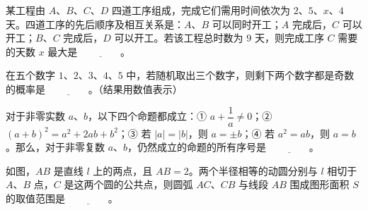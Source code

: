 \begin{question}
某工程由 $A$、$B$、$C$、$D$ 四道工序组成，完成它们需用时间依次为 $2$、$5$、$x$、$4$ 天。四道工序的先后顺序及相互关系是：$A$、$B$ 可以同时开工；$A$ 完成后，$C$ 可以开工；$B$、$C$ 完成后，$D$ 可以开工。若该工程总时数为 $9$ 天，则完成工序 $C$ 需要的天数 $x$ 最大是 $\underline{\qquad\qquad}$。

\end{question}
\begin{question}
在五个数字 $1$、$2$、$3$、$4$、$5$ 中，若随机取出三个数字，则剩下两个数字都是奇数的概率是 $\underline{\qquad\qquad}$。（结果用数值表示）

\end{question}
\begin{question}
对于非零实数 $a$、$b$，以下四个命题都成立：① $a+\dfrac{1}{a}\ne0$；② $(a+b)^2=a^2+2ab+b^2$；③ 若 $|a|=|b|$，则 $a=\pm b$；④ 若 $a^2=ab$，则 $a=b$。那么，对于非零复数 $a$、$b$，仍然成立的命题的所有序号是 $\underline{\qquad\qquad}$。

\Needspace{0.4\textheight}
\end{question}
\begin{question}
如图，$AB$ 是直线 $l$ 上的两点，且 $AB=2$。两个半径相等的动圆分别与 $l$ 相切于 $A$、$B$ 点，$C$ 是这两个圆的公共点，则圆弧 $AC$、$CB$ 与线段 $AB$ 围成图形面积 $S$ 的取值范围是 $\underline{\qquad\qquad}$。
\nopagebreak[4]
\begin{center}\end{center}
\nopagebreak[4]
\end{question}

